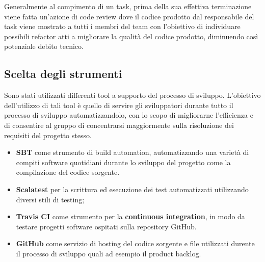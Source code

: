 Generalmente al compimento di un task, prima della sua effettiva terminazione viene fatta un'azione di code review dove il codice prodotto dal responsabile del task viene mostrato a tutti i membri del team con l'obiettivo di individuare possibili refactor atti a migliorare la qualità del codice prodotto, diminuendo così potenziale debito tecnico.


\subsection{Scelta degli strumenti}
Sono stati utilizzati differenti tool a supporto del processo di sviluppo. L'obiettivo dell'utilizzo di tali tool è quello di servire gli sviluppatori durante tutto il processo di sviluppo automatizzandolo, con lo scopo di migliorarne l'efficienza e di consentire al gruppo di concentrarsi maggiormente sulla risoluzione dei requisiti del progetto stesso.

\begin{itemize}
    \item \textbf{SBT} come strumento di build automation, automatizzando una varietà di compiti software quotidiani durante lo sviluppo del progetto come la compilazione del codice sorgente.
    \item \textbf{Scalatest} per la scrittura ed esecuzione dei test automatizzati utilizzando diversi stili di testing;
    \item \textbf{Travis CI} come strumento per la \textbf{continuous integration}, in modo da testare progetti software ospitati sulla repository GitHub.
    \item \textbf{GitHub} come servizio di hosting del codice sorgente e file utilizzati durente il processo di sviluppo quali ad esempio il product backlog. 
\end{itemize}